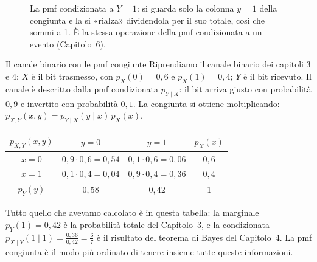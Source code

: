 \begin{figure}[H]
\centering
{}
\caption{La pmf condizionata a $Y = 1$: si guarda solo la colonna $y = 1$ della congiunta e la si «rialza» dividendola
per il suo totale, così che sommi a 1. È la stessa operazione della pmf condizionata a un evento (Capitolo~6).}
\end{figure}

\begin{esempio}{Il canale binario con le pmf congiunte}
Riprendiamo il canale binario dei capitoli 3 e 4: $X$ è il bit trasmesso, con $p_X(0) = 0{,}6$ e $p_X(1) = 0{,}4$;
$Y$ è il bit ricevuto. Il canale è descritto dalla pmf condizionata $p_{Y \mid X}$: il bit arriva giusto con
probabilità $0{,}9$ e invertito con probabilità $0{,}1$. La congiunta si ottiene moltiplicando:
$p_{X,Y}(x, y) = p_{Y \mid X}(y \mid x)\, p_X(x)$.
\begin{center}
\renewcommand{\arraystretch}{1.4}
\begin{tabular}{c|cc|c}
  $p_{X,Y}(x,y)$ & $y = 0$ & $y = 1$ & $p_X(x)$ \\ \hline
  $x = 0$ & $0{,}9 \cdot 0{,}6 = 0{,}54$ & $0{,}1 \cdot 0{,}6 = 0{,}06$ & $0{,}6$ \\
  $x = 1$ & $0{,}1 \cdot 0{,}4 = 0{,}04$ & $0{,}9 \cdot 0{,}4 = 0{,}36$ & $0{,}4$ \\ \hline
  $p_Y(y)$ & $0{,}58$ & $0{,}42$ & 1
\end{tabular}
\end{center}
Tutto quello che avevamo calcolato è in questa tabella: la marginale $p_Y(1) = 0{,}42$ è la probabilità totale del
Capitolo~3, e la condizionata $p_{X \mid Y}(1 \mid 1) = \frac{0{,}36}{0{,}42} = \frac67$ è il risultato del teorema di
Bayes del Capitolo~4. La pmf congiunta è il modo più ordinato di tenere insieme tutte queste informazioni.
\end{esempio}

